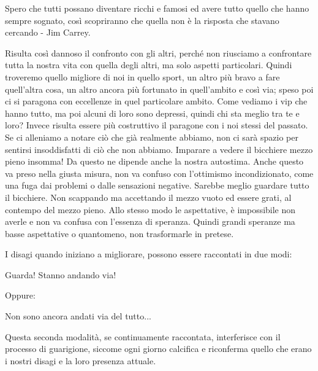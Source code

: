 \documentclass[12pt]{book} %
\begin{document}
Spero che tutti possano diventare ricchi e famosi ed avere tutto quello che hanno sempre sognato, così scopriranno che
quella non è la risposta che stavano cercando - Jim Carrey.

Risulta così dannoso il confronto con gli altri, perché non riusciamo a confrontare tutta la nostra vita con quella
degli altri, ma solo aspetti particolari. Quindi troveremo quello migliore di noi in quello sport, un altro più bravo a
fare quell'altra cosa, un altro ancora più fortunato in quell'ambito e così
via; speso poi ci si paragona con eccellenze in quel particolare ambito. Come vediamo i vip che hanno tutto, ma poi
alcuni di loro sono depressi, quindi chi sta meglio tra te e loro? Invece risulta essere più costruttivo il paragone
con i noi stessi del passato. Se ci alleniamo a notare ciò che già realmente abbiamo, non ci sarà spazio per sentirsi
insoddisfatti di ciò che non abbiamo. Imparare a vedere il bicchiere mezzo pieno insomma! Da questo ne dipende anche la
nostra autostima. Anche questo va preso nella giusta misura, non va confuso con l'ottimismo
incondizionato, come una fuga dai problemi o dalle sensazioni negative. Sarebbe meglio guardare tutto il bicchiere. Non
scappando ma accettando il mezzo vuoto ed essere grati, al contempo del mezzo pieno. Allo stesso modo le aspettative, è
impossibile non averle e non va confusa con l'essenza di speranza. Quindi grandi speranze ma basse
aspettative o quantomeno, non trasformarle in pretese.

I disagi quando iniziano a migliorare, possono essere raccontati in due modi:

Guarda! Stanno andando via!

Oppure:

Non sono ancora andati via del tutto...

Questa seconda modalità, se continuamente raccontata, interferisce con il processo di guarigione, siccome ogni giorno
calcifica e riconferma quello che erano i nostri disagi e la loro presenza attuale.
\end{document}
